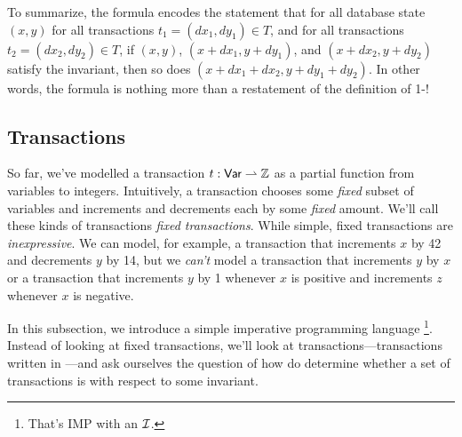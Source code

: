 To summarize, the formula encodes the statement that for all database state
$(x, y)$ for all transactions $t_1 = (dx_1, dy_1) \in T$, and for all
transactions $t_2 = (dx_2, dy_2) \in T$, if $(x, y)$, $(x + dx_1, y + dy_1)$,
and $(x + dx_2, y + dy_2)$ satisfy the invariant, then so does $(x + dx_1 +
dx_2, y + dy_1 + dy_2)$. In other words, the formula is nothing more than a
restatement of the definition of 1-\iconfluence!

\subsection{\imp{} Transactions}\label{sec:imptxns}
So far, we've modelled a transaction $t: \textsf{Var} \rightharpoonup \mathbb{Z}$ as a
partial function from variables to integers. Intuitively, a transaction chooses
some \emph{fixed} subset of variables and increments and decrements each by
some \emph{fixed} amount. We'll call these kinds of transactions \emph{fixed
transactions}. While simple, fixed transactions are \emph{inexpressive}. We can
model, for example, a transaction that increments $x$ by 42 and decrements $y$
by 14, but we \emph{can't} model a transaction that increments $y$ by $x$ or a
transaction that increments $y$ by 1 whenever $x$ is positive and increments
$z$ whenever $x$ is negative.

In this subsection, we introduce a simple imperative programming language
\imp{}\footnote{That's IMP \cite{winskel1993formal} with an $\mathcal{I}{}$.}.
Instead of looking at fixed transactions, we'll look at \imp{}
transactions---transactions written in \imp{}---and ask ourselves the question
of how do determine whether a set of \imp{} transactions is \iconfluent{} with
respect to some invariant.

